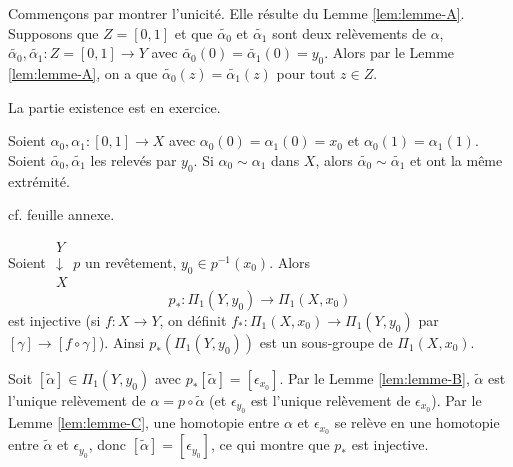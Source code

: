   \begin{preuve}
    Commençons par montrer l'unicité. Elle résulte du Lemme \ref{lem:lemme-A}. Supposons que $Z = [0,1]$ et
    que $\tilde{\alpha_0}$ et $\tilde{\alpha_1}$ sont deux relèvements de $\alpha$, $\tilde{\alpha_0},
    \tilde{\alpha_1} : Z = [0,1] \to Y$ avec $\tilde{\alpha_0}(0) = \tilde{\alpha_1}(0) = y_0$. Alors par le
    Lemme \ref{lem:lemme-A}, on a que $\tilde{\alpha_0}(z) = \tilde{\alpha_1}(z)$ pour tout $z \in Z$.

    La partie existence est en exercice.
   \end{preuve}

   \begin{lem}  \label{lem:lemme-C}
     Soient $\alpha_0, \alpha_1 : [0,1] \to X$ avec $\alpha_0 (0) = \alpha_1(0) = x_0$ et $\alpha_0(1) =
     \alpha_1(1)$. Soient $\tilde{\alpha_0}, \tilde{\alpha_1}$ les relevés par $y_0$. Si $\alpha_0 \sim
     \alpha_1$ dans $X$, alors $\tilde{\alpha_0} \sim \tilde{\alpha_1}$ et ont la même extrémité.
   \end{lem}

   \begin{preuve}
     cf. feuille annexe.
   \end{preuve}

   
   \begin{theo} \label{thm:thm-1}
     Soient $\substack{Y\\\downarrow\\ X}p$ un revêtement, $y_0 \in p^{-1}(x_0)$. Alors 
       \[p_\ast : \Pi_1(Y, y_0) \to \Pi_1(X, x_0)\]
     est injective (si $f: X \to Y$, on définit $f_\ast: \Pi_1(X, x_0) \to \Pi_1(Y, y_0)$ par $[\gamma] \to [f
     \circ \gamma]$). Ainsi $p_\ast(\Pi_1(Y, y_0))$ est un sous-groupe de $\Pi_1(X, x_0)$.
   \end{theo}

   \begin{preuve}
     Soit $[\tilde{\alpha}] \in \Pi_1(Y, y_0)$ avec $p_\ast[\tilde{\alpha}] = [\epsilon_{x_0}]$. Par le Lemme
     \ref{lem:lemme-B}, $\tilde{\alpha}$ est l'unique relèvement de $\alpha = p \circ \tilde{\alpha}$ (et
     $\epsilon_{y_0}$ est l'unique relèvement de $\epsilon_{x_0}$). Par le Lemme \ref{lem:lemme-C}, une
     homotopie entre $\alpha$ et $\epsilon_{x_0}$ se relève en une homotopie entre $\tilde{\alpha}$ et
     $\epsilon_{y_0}$, donc $[\tilde{\alpha}] = [\epsilon_{y_0}]$, ce qui montre que $p_\ast$ est injective.
   \end{preuve}

